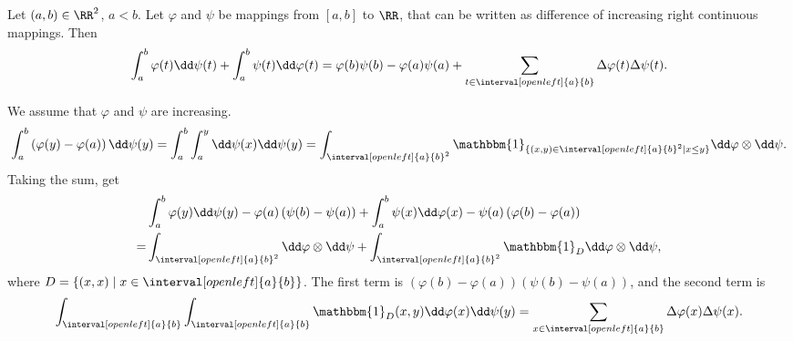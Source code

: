 \begin{theoremenv}
    Let $(a,b)\in \RR^2$, $a<b$. Let $\varphi$ and $\psi$ be mappings from $[a,b]$ to $\RR$, that can be written as difference of increasing right continuous mappings.
    Then
    $$ \int_{a}^{b} \varphi (t)\dd \psi(t) +\int_{a}^{b} \psi(t) \dd\varphi(t)= \varphi(b)\psi(b)-\varphi(a)\psi(a)+\sum_{t\in \interval[open left]{a}{b}}\Delta\varphi(t)\Delta\psi(t).$$
\end{theoremenv}
\begin{proofenv}
    We assume that $\varphi$ and $\psi$ are increasing.
    $$ \int_{a}^{b}\left(\varphi(y)-\varphi(a)\right)\dd \psi(y)=\int_{a}^{b}\int_{a}^{y}\dd\psi(x) \dd \psi (y)=\int_{\interval[open left]{a}{b}^2}\mathbbm{1}_{\{(x,y)\in \interval[open left]{a}{b}^2\mid x\le y\}}\dd\varphi\otimes\dd \psi.$$
    Taking the sum, get
    \begin{align*}
        &\int_{a}^{b}\varphi(y)\dd\psi(y)-\varphi(a)\left(\psi(b)-\psi(a)\right)+\int_{a}^{b}\psi(x)\dd \varphi(x)-\psi(a)\left(\varphi(b)-\varphi(a)\right)\\
        =& \int_{\interval[open left]{a}{b}^2}\dd\varphi\otimes \dd\psi +\int_{\interval[open left]{a}{b}^2}\mathbbm{1}_{D} \dd\varphi\otimes \dd\psi,
    \end{align*}
    where $D=\{(x,x)\mid x\in \interval[open left]{a}{b}\}$. The first term is $(\varphi(b)-\varphi(a))(\psi(b)-\psi(a))$, and the second term is 
    $$ \int_{\interval[open left]{a}{b}}\int_{\interval[open left]{a}{b}}\mathbbm{1}_{D}(x,y)\dd\varphi(x)\dd\psi(y)=\sum_{x\in \interval[open left]{a}{b}}\Delta\varphi(x)\Delta\psi(x).$$



 
\tikzset{
pattern size/.store in=\mcSize, 
pattern size = 5pt,
pattern thickness/.store in=\mcThickness, 
pattern thickness = 0.3pt,
pattern radius/.store in=\mcRadius, 
pattern radius = 1pt}
\makeatletter
{}
\makeatother

 

\end{proofenv}
